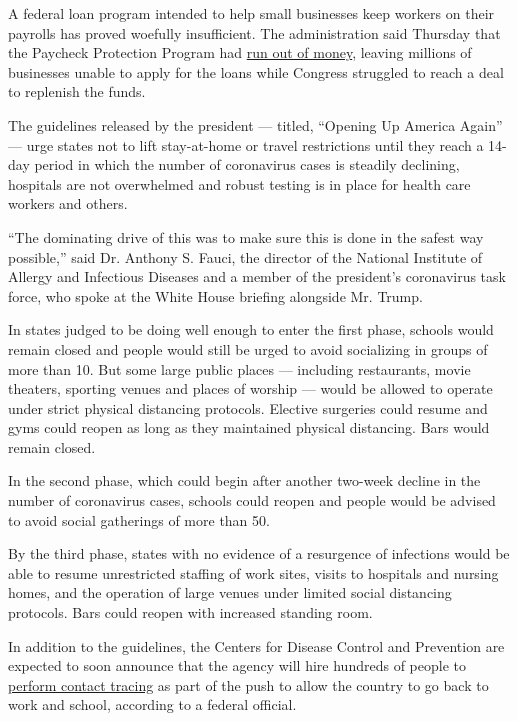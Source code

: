 A federal loan program intended to help small businesses keep workers on
their payrolls has proved woefully insufficient. The administration said
Thursday that the Paycheck Protection Program had
\href{https://www.nytimes3xbfgragh.onion/2020/04/15/us/politics/coronavirus-small-business-program.html}{run
out of money}, leaving millions of businesses unable to apply for the
loans while Congress struggled to reach a deal to replenish the funds.

The guidelines released by the president --- titled, ``Opening Up
America Again'' --- urge states not to lift stay-at-home or travel
restrictions until they reach a 14-day period in which the number of
coronavirus cases is steadily declining, hospitals are not overwhelmed
and robust testing is in place for health care workers and others.

``The dominating drive of this was to make sure this is done in the
safest way possible,'' said Dr. Anthony S. Fauci, the director of the
National Institute of Allergy and Infectious Diseases and a member of
the president's coronavirus task force, who spoke at the White House
briefing alongside Mr. Trump.

In states judged to be doing well enough to enter the first phase,
schools would remain closed and people would still be urged to avoid
socializing in groups of more than 10. But some large public places ---
including restaurants, movie theaters, sporting venues and places of
worship --- would be allowed to operate under strict physical distancing
protocols. Elective surgeries could resume and gyms could reopen as long
as they maintained physical distancing. Bars would remain closed.

In the second phase, which could begin after another two-week decline in
the number of coronavirus cases, schools could reopen and people would
be advised to avoid social gatherings of more than 50.

By the third phase, states with no evidence of a resurgence of
infections would be able to resume unrestricted staffing of work sites,
visits to hospitals and nursing homes, and the operation of large venues
under limited social distancing protocols. Bars could reopen with
increased standing room.

In addition to the guidelines, the Centers for Disease Control and
Prevention are expected to soon announce that the agency will hire
hundreds of people to
\href{https://www.nytimes3xbfgragh.onion/2020/04/16/us/coronavirus-massachusetts-contact-tracing.html}{perform
contact tracing} as part of the push to allow the country to go back to
work and school, according to a federal official.

